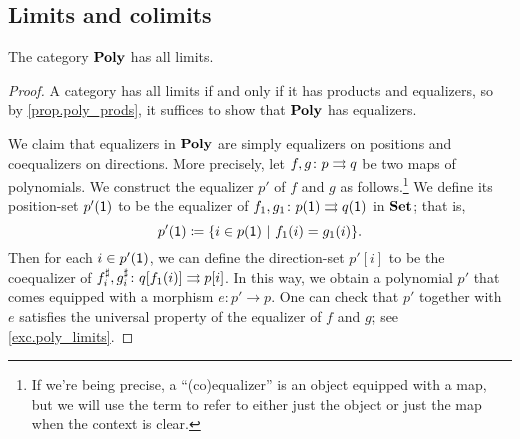 \documentclass[Book-Poly]{subfiles}
\begin{document}
\subsection{Limits and colimits}

\begin{theorem}\label{thm.poly_limits}
The category $\mathbf{Poly}$ has all limits.
\end{theorem}
\begin{proof}
A category has all limits if and only if it has products and equalizers, so by \cref{prop.poly_prods}, it suffices to show that $\mathbf{Poly}$ has equalizers. 

We claim that equalizers in $\mathbf{Poly}$ are simply equalizers on positions and coequalizers on directions.
More precisely, let $f,g \colon p \rightrightarrows q$ be two maps of polynomials.
We construct the equalizer $p'$ of $f$ and $g$ as follows.\footnote{If we're being precise, a ``(co)equalizer'' is an object equipped with a map, but we will use the term to refer to either just the object or just the map when the context is clear.}
We define its position-set $p'(\textsf{1})$ to be the equalizer of $f_1,g_1 \colon p(\textsf{1}) \rightrightarrows q(\textsf{1})$ in $\mathbf{Set}$; that is,
\[
    p'(\textsf{1}) \coloneqq \{i \in p(\textsf{1}) \ | \ f_1(i) = g_1(i)\}.
\]
Then for each $i \in p'(\textsf{1})$, we can define the direction-set $p'[i]$ to be the coequalizer of $f^\sharp_i, g^\sharp_i \colon q[f_1(i)] \rightrightarrows p[i]$.
In this way, we obtain a polynomial $p'$ that comes equipped with a morphism $e \colon p' \to p$.
One can check that $p'$ together with $e$ satisfies the universal property of the equalizer of $f$ and $g$; see \cref{exc.poly_limits}.
\end{proof}
\end{document}
